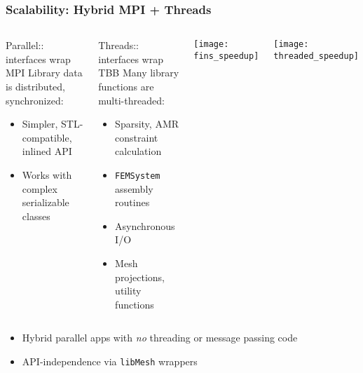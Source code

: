 \documentclass[mathserif]{beamer}
\newcommand{\software}[1]{\texttt{#1}}
\newcommand{\libMesh}{\software{libMesh}}
\begin{document}
\begin{frame}
\frametitle{Scalability: Hybrid MPI + Threads}

\begin{columns}
\begin{block}{Parallel:: interfaces wrap MPI}
Library data is distributed, synchronized:
\begin{itemize}
	\item Simpler, STL-compatible, inlined API
	\item Works with complex serializable classes
\end{itemize}
\end{block}

\begin{block}{Threads:: interfaces wrap TBB}
Many library functions are multi-threaded:
\begin{itemize}
	\item Sparsity, AMR constraint calculation
	\item {\texttt{FEMSystem}} assembly routines
	\item Asynchronous I/O
	\item Mesh projections, utility functions
\end{itemize}
\end{block}

\center
\texttt{[image: fins\_speedup]}

\center
\texttt{[image: threaded\_speedup]}

\end{columns}

\begin{itemize}
	\item Hybrid parallel apps with {\emph{no}}
		threading or message passing code
	\item API-independence via \libMesh{} wrappers
\end{itemize}
\end{frame}
\end{document}
